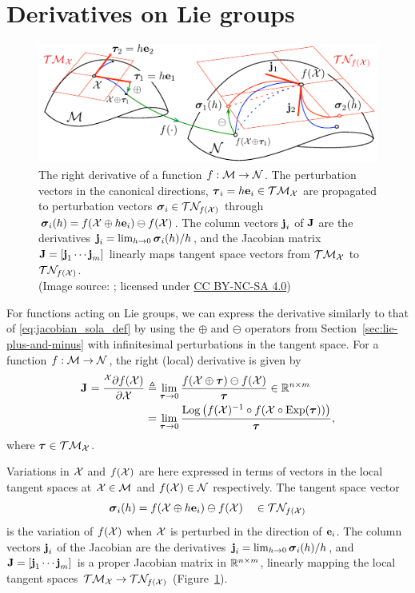 \section{Derivatives on Lie groups} \label{sec:derivative-Lie}
\begin{figure}[htb]
    \centering
    \includegraphics[width=0.9\columnwidth]{figures/jacobian.pdf}
    \caption{The right derivative of a function $f: \mathcal{M} \to \mathcal{N}$.
    The perturbation vectors in the canonical directions, ${\boldsymbol{\mathbf{\tau}}}_i = h {\boldsymbol{\mathbf{e}}}_i \in \mathcal{T}\mathcal{M}_{\mathcal{X}}$ are propagated to perturbation vectors ${\boldsymbol{\mathbf{\sigma}}}_i \in \mathcal{T}\mathcal{N}_{f(\mathcal{X})}$ through ${\boldsymbol{\mathbf{\sigma}}}_i(h) = f(\mathcal{X} \oplus h {\boldsymbol{\mathbf{e}}}_i) \ominus f(\mathcal{X})$.
    The column vectors ${\boldsymbol{\mathbf{j}}}_i$ of ${\boldsymbol{\mathbf{J}}}$ are the derivatives ${\boldsymbol{\mathbf{j}}}_i = \lim_{h \to 0} {\boldsymbol{\mathbf{\sigma}}}_i(h)/h$, and the Jacobian matrix ${\boldsymbol{\mathbf{J}}} = [{\boldsymbol{\mathbf{j}}}_1 \cdots {\boldsymbol{\mathbf{j}}}_m]$ linearly maps tangent space vectors from $\mathcal{T}\mathcal{M}_{\mathcal{X}}$ to $\mathcal{T}\mathcal{N}_{f(\mathcal{X})}$.\\
    (Image source: \cite{SolaARobotics}; licensed under \href{https://creativecommons.org/licenses/by-nc-sa/4.0/}{CC BY-NC-SA 4.0})}
    \label{fig:lie-jacobian}
\end{figure}

For functions acting on Lie groups, we can express the derivative similarly to that of \eqref{eq:jacobian_sola_def} by using the $\oplus$ and $\ominus$ operators from Section~\ref{sec:lie-plus-and-minus} with infinitesimal perturbations in the tangent space.
For a function $f : \mathcal{M} \to \mathcal{N}$, the right (local) derivative is given by
\begin{align}
  {{\boldsymbol{\mathbf{J}}}^{}_{}} = \frac{^{\mathcal{X}} \partial f(\mathcal{X})}{\partial \mathcal{X}} &\triangleq 
  \lim_{{\boldsymbol{\mathbf{\tau}}} \to 0} \frac{f(\mathcal{X} \oplus {\boldsymbol{\mathbf{\tau}}}) \ominus f(\mathcal{X})}{{\boldsymbol{\mathbf{\tau}}}} \in {\mathbb R}^{n \times m} \label{eq:lie-derivative}\\
  &= \lim_{{\boldsymbol{\mathbf{\tau}}} \to 0} \frac{\operatorname*{Log} \left( f(\mathcal{X})^{-1} \circ f(\mathcal{X} \circ \operatorname*{Exp}({\boldsymbol{\mathbf{\tau}}})) \right)}{{\boldsymbol{\mathbf{\tau}}}},
\end{align}
where ${\boldsymbol{\mathbf{\tau}}} \in \mathcal{T}\mathcal{M}_{\mathcal{X}}$.

Variations in $\mathcal{X}$ and $f(\mathcal{X})$ are here expressed in terms of vectors in the local tangent spaces at $\mathcal{X} \in \mathcal{M}$ and $f(\mathcal{X}) \in \mathcal{N}$ respectively.
The tangent space vector
\begin{equation}
  {\boldsymbol{\mathbf{\sigma}}}_i(h) = f(\mathcal{X} \oplus h {\boldsymbol{\mathbf{e}}}_i) \ominus f(\mathcal{X}) \quad \in \mathcal{T}\mathcal{N}_{f(\mathcal{X})}
\end{equation}
is the variation of $f(\mathcal{X})$ when $\mathcal{X}$ is perturbed in the direction of ${\boldsymbol{\mathbf{e}}}_i$.
The column vectors ${\boldsymbol{\mathbf{j}}}_i$ of the Jacobian are the derivatives ${\boldsymbol{\mathbf{j}}}_i = \lim_{h \to 0} {\boldsymbol{\mathbf{\sigma}}}_i(h)/h$, and ${\boldsymbol{\mathbf{J}}} = [{\boldsymbol{\mathbf{j}}}_1 \cdots {\boldsymbol{\mathbf{j}}}_m]$ is a proper Jacobian matrix in ${\mathbb R}^{n \times m}$, linearly mapping the local tangent spaces $\mathcal{T}\mathcal{M}_{\mathcal{X}} \to \mathcal{T}\mathcal{N}_{f(\mathcal{X})}$ (Figure~\ref{fig:lie-jacobian}).

